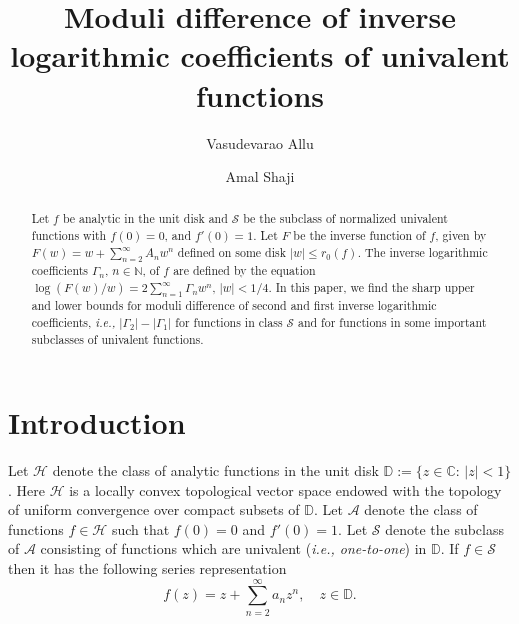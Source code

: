 \documentclass[a4paper,12pt]{amsart}
\theoremstyle{definition}
\numberwithin{equation}{section}
\begin{document}
\title[Moduli difference of inverse logarithmic coefficients]{Moduli difference of inverse logarithmic coefficients of univalent functions}


\author[Vasudevarao Allu]{Vasudevarao Allu}
\address{Vasudevarao Allu, School of Basic Sciences, Indian Institute of Technology Bhubaneswar,
	 Odisha, India.}
\author[Amal Shaji]{Amal Shaji}
\address{Amal Shaji, School of Basic Sciences, Indian Institute of Technology Bhubaneswar,
Bhubaneswar-752050, Odisha, India.}


\begin{abstract}
Let $f$ be analytic in the unit disk and $\mathcal{S}$ be the subclass of
normalized univalent functions with $f(0) = 0$, and $f'(0) = 1$. Let $F$ be the inverse function of $f$, given by $F(w)=w+\sum_{n=2}^{\infty}A_nw^n$ defined on some disk $|w|\le r_0(f)$. The  inverse logarithmic
 coefficients $\Gamma_n$, $n \in \mathbb{N}$, of $f$ are defined by the equation $ \log(F(w)/w)=2\sum_{n=1}^{\infty}\Gamma_{n}w^{n},\,|w|<1/4.$ In this paper, we find the 
sharp upper and lower bounds for moduli difference of second and first inverse logarithmic coefficients, {\em i.e.,} $|\Gamma_2|-|\Gamma_1|$ for functions in class $\mathcal{S}$ and for functions in some important subclasses of univalent functions. 
\end{abstract}
\maketitle
\section{Introduction}\label{Introduction}
Let $\mathcal{H}$ denote the class of analytic functions in the unit disk $\mathbb{D}:=\{z\in\mathbb{C}:\, |z|<1\}$. Here $\mathcal{H}$ is 
a locally convex topological vector space endowed with the topology of uniform convergence over compact subsets of $\mathbb{D}$. Let $\mathcal{A}$ denote the class of functions $f\in \mathcal{H}$ such that $f(0)=0$ and $f'(0)=1$.  Let $\mathcal{S}$ 
denote the subclass of  $\mathcal{A}$ consisting of functions which are univalent ({\em i.e., one-to-one}) in $\mathbb{D}$. 
If $f\in\mathcal{S}$ then it has the following series representation
\begin{equation}\label{S}
	f(z)= z+\sum_{n=2}^{\infty}a_n z^n, \quad z\in \mathbb{D}.
\end{equation}
\end{document}
